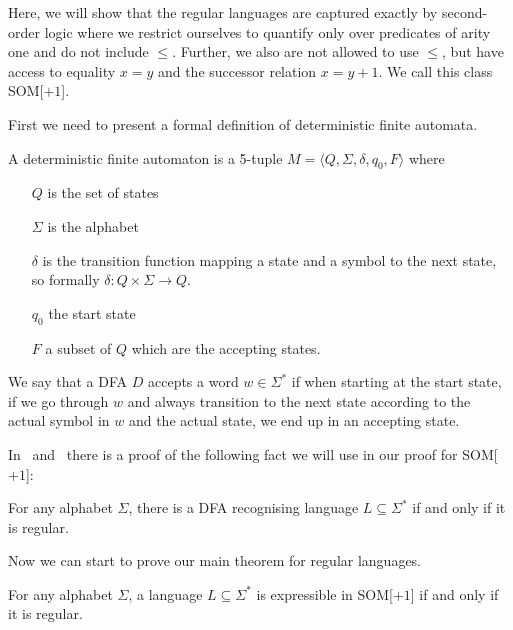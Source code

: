 Here, we will show that the regular languages are captured exactly by second-order logic where we restrict ourselves to quantify only over predicates of arity one and do not include $\leq$.
Further, we also are not allowed to use $\leq$, but have access to equality $x = y$ and the successor relation $x = y + 1$.
We call this class SOM[$+1$].

First we need to present a formal definition of deterministic finite automata.
\begin{define}[DFA]
    A deterministic finite automaton is a 5-tuple $M = \langle Q, \Sigma, \delta, q_0,  F \rangle$ where
    \begin{itemize}
        \item[$Q$] is the set of states
        \item[$\Sigma$] is the alphabet
        \item[$\delta$] is the transition function mapping a state and a symbol to the next state, so formally $\delta : Q\times \Sigma \to Q$.
        \item[$q_0$] the start state
        \item[$F$] a subset of $Q$ which are the accepting states.
    \end{itemize}
\end{define}
We say that a DFA $D$ accepts a word $w \in \Sigma^{*}$ if when starting at the start state, if we go through $w$ and always transition to the next state according to the actual symbol in $w$ and the actual state, we end up in an accepting state.

In~\cite{theory-cs} and~\cite{Straubing1994} there is a proof of the following fact we will use in our proof for SOM[$+1$]:
\begin{theorem}
    For any alphabet $\Sigma$, there is a DFA recognising language $L \subseteq \Sigma^{*}$ if and only if it is regular.
\end{theorem}

Now we can start to prove our main theorem for regular languages.
\begin{theorem}
    For any alphabet $\Sigma$, a language $L \subseteq \Sigma^{*}$ is expressible in SOM[$+1$] if and only if it is regular.
\end{theorem}

